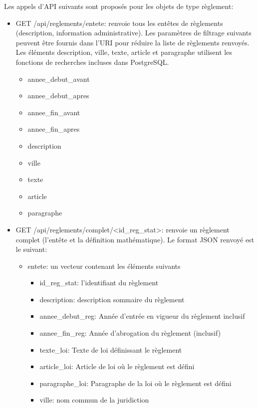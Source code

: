 Les appels d'\ac{API} suivants sont proposés pour les objets de type règlement:
\begin{itemize}
    \item GET /api/reglements/entete: renvoie tous les entêtes de règlements (description, information administrative). Les paramètres de filtrage suivants peuvent être fournis dans l'\ac{URI} pour réduire la liste de règlements renvoyés. Les éléments description, ville, texte, article et paragraphe utilisent les fonctions de recherches incluses dans PostgreSQL. \parencite{postgresql_global_development_group_811_2025}
    \begin{itemize}
        \item annee\_debut\_avant
        \item annee\_debut\_apres
        \item annee\_fin\_avant
        \item annee\_fin\_apres
        \item description
        \item ville
        \item texte
        \item article
        \item paragraphe
    \end{itemize}
    \item GET /api/reglements/complet/<id\_reg\_stat>: renvoie un règlement complet (l'entête et la définition mathématique). Le format JSON renvoyé est le suivant: 
    \begin{itemize}
        \item entete: un vecteur contenant les éléments suivants
        \begin{itemize}
            \item id\_reg\_stat: l'identifiant du règlement
            \item description: description sommaire du règlement
            \item annee\_debut\_reg: Année d'entrée en vigueur du règlement inclusif
            \item annee\_fin\_reg: Année d'abrogation du règlement (inclusif)
            \item texte\_loi: Texte de loi définissant le règlement
            \item article\_loi: Article de loi où le règlement est défini
            \item paragraphe\_loi: Paragraphe de la loi où le règlement est défini
            \item ville: nom commun de la juridiction

\end{itemize}
\end{itemize}
\end{itemize}
